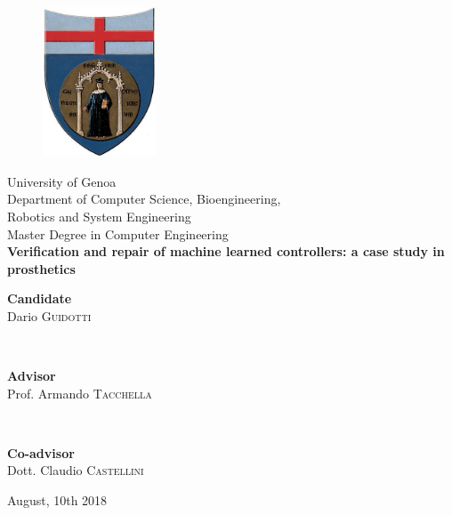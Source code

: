 \begin{titlepage}
%
\begin{center}
\begin{figure}[htbp]
\centering
\includegraphics[width=0.3\textwidth]{Images/unige2.jpg}
\end{figure}
%
{\LARGE University of Genoa\\}
%
%
{\Large {Department of Computer Science, Bioengineering,\\ Robotics and System Engineering}\\}
%
\vspace{0.7cm}
%
{\LARGE {Master Degree in Computer Engineering}\\}
%
\vspace{0.8cm}
%
%
%
{\Huge \textbf{Verification and repair of machine learned controllers: a case study in prosthetics}\\}
%
%
\vspace{1.0cm}
%
\end{center}
%
\begin{minipage}{\textwidth}
\begin{flushright}
{\Large{ \bfseries Candidate}\\[0.1cm]
Dario \textsc{Guidotti}}
\end{flushright}
\end{minipage}
\\[1cm]
%
\begin{minipage}{0.5\textwidth}
\begin{flushleft}
{\Large
{\bfseries Advisor}\\[0.1cm]
Prof. Armando \textsc{Tacchella}}
\end{flushleft}
\end{minipage}
\\[0.4cm]
\begin{minipage}{0.5\textwidth}
\begin{flushleft}
{\Large
{\bfseries Co-advisor}\\[0.1cm]
Dott. Claudio \textsc{Castellini}}
\end{flushleft}
\end{minipage}
%
\vfill
\begin{center}
{\Large August, 10th 2018}
\end{center}
\end{titlepage}